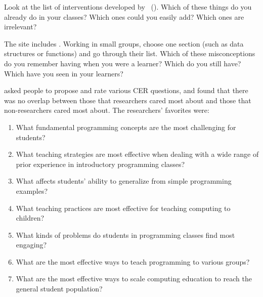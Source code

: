 
Look at the list of interventions developed by~\cite{Viha2014} ().
Which of these things do you already do in your classes?
Which ones could you easily add?
Which ones are irrelevant?


The  site
includes .
Working in small groups,
choose one section (such as data structures or functions) and go through their list.
Which of these misconceptions do you remember having when you were a learner?
Which do you still have?
Which have you seen in your learners?


\cite{Denn2019} asked people to propose and rate various CER questions,
and found that there was no overlap between those that researchers cared most about
and those that non-researchers cared most about.
The researchers' favorites were:

\begin{enumerate}

\item
  What fundamental programming concepts are the most challenging for students?

\item
  What teaching strategies are most effective when dealing with a wide range of prior experience in introductory programming classes?

\item
  What affects students' ability to generalize from simple programming examples?

\item
  What teaching practices are most effective for teaching computing to children?

\item
  What kinds of problems do students in programming classes find most engaging?    

\item
  What are the most effective ways to teach programming to various groups?

\item
  What are the most effective ways to scale computing education to reach the general student population?

\end{enumerate}

